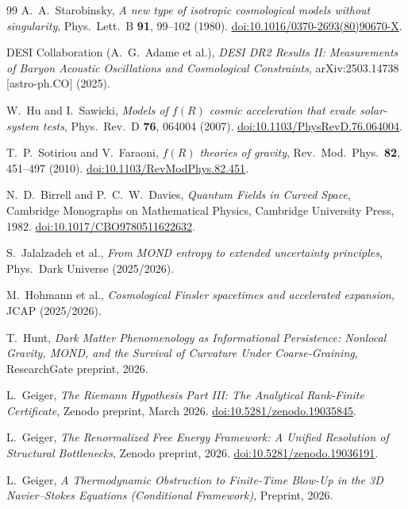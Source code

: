 \documentclass[12pt,a4paper]{article}
\theoremstyle{definition}
\theoremstyle{plain}
\theoremstyle{remark}
\begin{document}
\begin{thebibliography}{99}
A.~A.~Starobinsky,
\textit{A new type of isotropic cosmological models without singularity},
Phys.\ Lett.\ B \textbf{91}, 99--102 (1980).
\href{https://doi.org/10.1016/0370-2693(80)90670-X}{doi:10.1016/0370-2693(80)90670-X}.

DESI Collaboration (A.~G.~Adame et al.),
\textit{DESI DR2 Results II: Measurements of Baryon Acoustic Oscillations and Cosmological Constraints},
arXiv:2503.14738 [astro-ph.CO] (2025).

W.~Hu and I.~Sawicki,
\textit{Models of $f(R)$ cosmic acceleration that evade solar-system tests},
Phys.\ Rev.\ D \textbf{76}, 064004 (2007).
\href{https://doi.org/10.1103/PhysRevD.76.064004}{doi:10.1103/PhysRevD.76.064004}.

T.~P.~Sotiriou and V.~Faraoni,
\textit{$f(R)$ theories of gravity},
Rev.\ Mod.\ Phys.\ \textbf{82}, 451--497 (2010).
\href{https://doi.org/10.1103/RevModPhys.82.451}{doi:10.1103/RevModPhys.82.451}.

N.~D.~Birrell and P.~C.~W.~Davies,
\textit{Quantum Fields in Curved Space},
Cambridge Monographs on Mathematical Physics, Cambridge University Press, 1982.
\href{https://doi.org/10.1017/CBO9780511622632}{doi:10.1017/CBO9780511622632}.

S.~Jalalzadeh et al.,
\textit{From MOND entropy to extended uncertainty principles},
Phys.\ Dark Universe (2025/2026).

M.~Hohmann et al.,
\textit{Cosmological Finsler spacetimes and accelerated expansion},
JCAP (2025/2026).

T.~Hunt,
\textit{Dark Matter Phenomenology as Informational Persistence: Nonlocal Gravity, MOND, and the Survival of Curvature Under Coarse-Graining},
ResearchGate preprint, 2026.

L.~Geiger, \emph{The Riemann Hypothesis Part III: The Analytical Rank-Finite Certificate}, Zenodo preprint, March 2026.
\href{https://doi.org/10.5281/zenodo.19035845}{doi:10.5281/zenodo.19035845}.

L.~Geiger, \emph{The Renormalized Free Energy Framework: A Unified Resolution of Structural Bottlenecks}, Zenodo preprint, 2026.
\href{https://doi.org/10.5281/zenodo.19036191}{doi:10.5281/zenodo.19036191}.

L.~Geiger, \emph{A Thermodynamic Obstruction to Finite-Time Blow-Up in the 3D Navier--Stokes Equations (Conditional Framework)},
Preprint, 2026.


\end{thebibliography}
\end{document}
